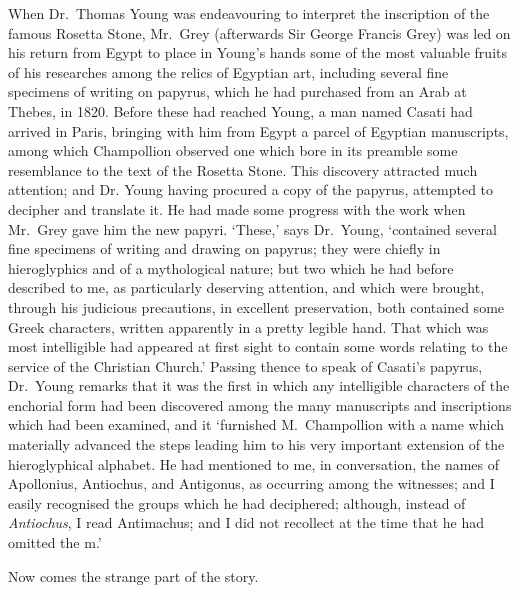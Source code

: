 \documentclass[letterpaper,12pt,oneside,openany]{memoir}
\begin{document}
When Dr.~Thomas Young was endeavouring to
interpret the inscription of the famous Rosetta Stone,
Mr.~Grey (afterwards Sir George Francis Grey) was led
on his return from Egypt to place in Young's hands
some of the most valuable fruits of his researches
among the relics of Egyptian art, including several
fine specimens of writing on papyrus, which he had
purchased from an Arab at Thebes, in 1820. Before
these had reached Young, a man named Casati had
arrived in Paris, bringing with him from Egypt a
parcel of Egyptian manuscripts, among which Champollion
observed one which bore in its preamble some
resemblance to the text of the Rosetta Stone. This
discovery attracted much attention; and Dr. Young
having procured a copy of the papyrus, attempted to
decipher and translate it. He had made some progress
with the work when Mr.~Grey gave him the new
papyri. `These,' says Dr.~Young, `contained several
fine specimens of writing and drawing on papyrus;
they were chiefly in hieroglyphics and of a mythological
nature; but two which he had before described to me,
as particularly deserving attention, and which were
brought, through his judicious precautions, in excellent
preservation, both contained some Greek characters,
written apparently in a pretty legible hand. That
which was most intelligible had appeared at first sight
to contain some words relating to the service of the
Christian Church.' Passing thence to speak of Casati's
papyrus, Dr.~Young remarks that it was the first in
which any intelligible characters of the enchorial form
had been discovered among the many manuscripts and
inscriptions which had been examined, and it `furnished
M.~Champollion with a name which materially
advanced the steps leading him to his very important
extension of the hieroglyphical alphabet. He had
mentioned to me, in conversation, the names of Apollonius,
Antiochus, and Antigonus, as occurring among
the witnesses; and I easily recognised the groups
which he had deciphered; although, instead of \emph{Antiochus},
I read Antimachus; and I did not recollect at
the time that he had omitted the m.'

Now comes the strange part of the story.
\end{document}
